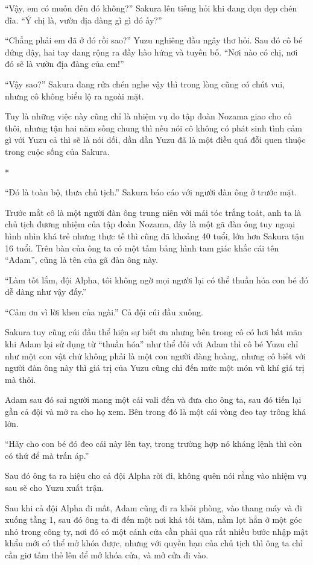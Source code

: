{``Vậy, em có muốn đến đó không?'' Sakura lên tiếng hỏi khi đang dọn dẹp
chén đĩa. ``Ý chị là, vườn địa đàng gì gì đó ấy?''

``Chẳng phải em đã ở đó rồi sao?'' Yuzu nghiêng đầu ngây thơ hỏi. Sau đó
cô bé đứng dậy, hai tay dang rộng ra đầy hào hứng và tuyên bố. ``Nơi nào
có chị, nơi đó sẽ là vườn địa đàng của em!''

``Vậy sao?'' Sakura đang rửa chén nghe vậy thì trong lòng cũng có chút
vui, nhưng cô không biểu lộ ra ngoài mặt.

Tuy là những việc này cũng chỉ là nhiệm vụ do tập đoàn Nozama giao cho
cô thôi, nhưng tận hai năm sống chung thì nếu nói cô không có phát sinh
tình cảm gì với Yuzu cả thì sẽ là nói dối, dần dần Yuzu đã là một điều
quá đỗi quen thuộc trong cuộc sống của Sakura.

*

``Đó là toàn bộ, thưa chủ tịch.'' Sakura báo cáo với người đàn ông ở
trước mặt.

Trước mắt cô là một người đàn ông trung niên với mái tóc trắng toát, anh
ta là chủ tịch đương nhiệm của tập đoàn Nozama, đây là một gã đàn ông
tuy ngoại hình nhìn khá trẻ nhưng thực tế thì cũng đã khoảng 40 tuổi,
lớn hơn Sakura tận 16 tuổi. Trên bàn của ông ta có một tấm bảng hình tam
giác khắc cái tên ``Adam'', cũng là tên của gã đàn ông này.

``Làm tốt lắm, đội Alpha, tôi không ngờ mọi người lại có thể thuần hóa
con bé đó dễ dàng như vậy đấy.''

``Cảm ơn vì lời khen của ngài.'' Cả đội cúi đầu xuống.

Sakura tuy cũng cúi đầu thể hiện sự biết ơn nhưng bên trong cô có hơi
bất mãn khi Adam lại sử dụng từ ``thuần hóa'' như thể đối với Adam thì
cô bé Yuzu chỉ như một con vật chứ không phải là một con người đàng
hoàng, nhưng cô biết với người đàn ông này thì giá trị của Yuzu cũng chỉ
đến mức một món vũ khí giá trị mà thôi.

Adam sau đó sai người mang một cái vali đến và đưa cho ông ta, sau đó
tiến lại gần cả đội và mở ra cho họ xem. Bên trong đó là một cái vòng
đeo tay trông khá lớn.

``Hãy cho con bé đó đeo cái này lên tay, trong trường hợp nó kháng lệnh
thì còn có thứ để mà trấn áp.''

Sau đó ông ta ra hiệu cho cả đội Alpha rời đi, không quên nói rằng vào
nhiệm vụ sau sẽ cho Yuzu xuất trận.

Sau khi cả đội Alpha đi mất, Adam cũng đi ra khỏi phòng, vào thang máy
và đi xuống tầng 1, sau đó ông ta đi đến một nơi khá tối tăm, nằm lọt
hẳn ở một góc nhỏ trong công ty, nơi đó có một cánh cửa cần phải qua rất
nhiều bước nhập mật khẩu mới có thể mở khóa được, nhưng với quyền hạn
của chủ tịch thì ông ta chỉ cần giơ tấm thẻ lên để mở khóa cửa, và mở
cửa đi vào.

}
